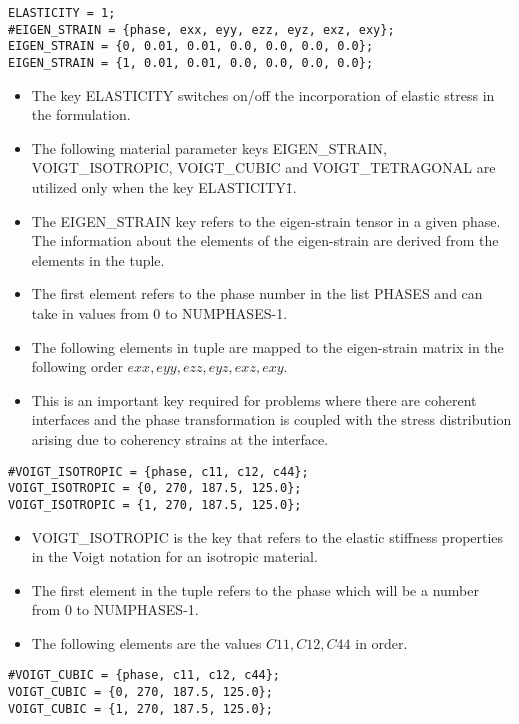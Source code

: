 \documentclass[a4paper,10pt]{article}
\begin{document}
\begin{lstlisting}
ELASTICITY = 1;
#EIGEN_STRAIN = {phase, exx, eyy, ezz, eyz, exz, exy};
EIGEN_STRAIN = {0, 0.01, 0.01, 0.0, 0.0, 0.0, 0.0};
EIGEN_STRAIN = {1, 0.01, 0.01, 0.0, 0.0, 0.0, 0.0};
\end{lstlisting}

\begin{itemize}
 \item The key ELASTICITY switches on/off the incorporation of elastic stress in the formulation.
 \item The following material parameter keys EIGEN\_STRAIN, VOIGT\_ISOTROPIC, VOIGT\_CUBIC and VOIGT\_TETRAGONAL are utilized only when the key ELASTICITY\=1.
 \item The EIGEN\_STRAIN key refers to the eigen-strain tensor in a given phase. The information about the elements of the eigen-strain are derived from the elements in the tuple. 
 \item The first element refers to the phase number in the list PHASES and can take in values from 0 to NUMPHASES-1.
 \item The following elements in tuple are mapped to the eigen-strain matrix in the following order $exx, eyy, ezz, eyz, exz, exy$.
 \item This is an important key required for problems where there are coherent interfaces and the phase transformation is coupled with the stress distribution arising due to coherency strains at the interface.
\end{itemize}


\begin{lstlisting}
#VOIGT_ISOTROPIC = {phase, c11, c12, c44};
VOIGT_ISOTROPIC = {0, 270, 187.5, 125.0};
VOIGT_ISOTROPIC = {1, 270, 187.5, 125.0};
\end{lstlisting}

\begin{itemize}
 \item VOIGT\_ISOTROPIC is the key that refers to the elastic stiffness properties in the Voigt notation for an isotropic material. 
 \item The first element in the tuple refers to the phase which will be a number from 0 to NUMPHASES-1.
 \item The following elements are the values $C11,C12,C44$ in order.
\end{itemize}


\begin{lstlisting}
#VOIGT_CUBIC = {phase, c11, c12, c44};
VOIGT_CUBIC = {0, 270, 187.5, 125.0};
VOIGT_CUBIC = {1, 270, 187.5, 125.0};
\end{lstlisting}
\end{document}
